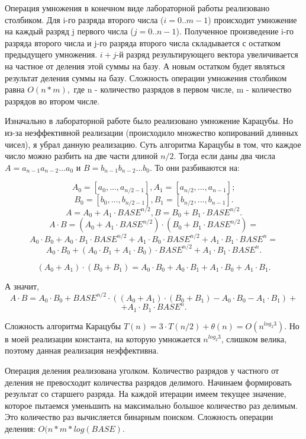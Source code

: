\documentclass[12pt]{article}
\begin{document}
Операция умножения в конечном виде лабораторной работы реализовано столбиком. Для i-го разряда второго числа ($i = 0..m-1$) происходит умножение на каждый разряд j первого числа ($j = 0..n-1$). Полученное произведение i-го разряда второго числа и j-го разряда второго числа складывается с остатком предыдущего умножения. $i+j$-й разряд результирующего вектора увеличивается на частное от деления этой суммы на базу. А новым остатком будет являться результат деления суммы на базу. Сложность операции умножения столбиком равна $O(n * m), $ где n - количество разрядов в первом числе, m - количество разрядов во втором числе.

Изначально в лабораторной работе было реализовано умножение Карацубы. Но из-за неэффективной реализации (происходило множество копирований длинных чисел), я убрал данную реализацию. Суть алгоритма Карацубы в том, что каждое число можно разбить на две части длиной $n / 2$. Тогда если даны два числа $A = a_{n-1}a_{n-2}...a_0$ и $B = b_{n-1}b_{n-2}...b_0$. То они разбиваются на:

$$
    A_0 = [a_0, ..., a_{n / 2 - 1}], A_1 = [a_{n / 2}, ..., a_{n - 1}];
$$
$$
    B_0 = [b_0, ..., b_{n / 2 - 1}], B_1 = [b_{n / 2}, ..., b_{n - 1}].
$$
$$
    A = A_0 + A_1 \cdot BASE^{n / 2}, B = B_0 + B_1 \cdot BASE^{n / 2}.
$$
$$A \cdot B = (A_0 + A_1 \cdot BASE^{n / 2}) \cdot (B_0 + B_1 \cdot BASE^{n / 2}) =$$ 
$$A_0 \cdot B_0 + A_0 \cdot B_1 \cdot BASE^{n / 2} + A_1 \cdot B_0 \cdot BASE^{n / 2} + A_1 \cdot B_1 \cdot BASE^{n} =$$
$$A_0 \cdot B_0 + (A_0 \cdot B_1 + A_1 \cdot B_0) \cdot BASE^{n / 2} + A_1 \cdot B_1 \cdot BASE^{n}.$$

$$(A_0 + A_1) \cdot (B_0 + B_1) = A_0 \cdot B_0 + A_0 \cdot B_1 + A_1 \cdot B_0 + A_1 \cdot B_1.$$

А значит, 
$$A \cdot B = A_0 \cdot B_0 + BASE^{n / 2} \cdot ((A_0 + A_1) \cdot (B_0 + B_1) - A_0 \cdot B_0 - A_1 \cdot B_1) + $$
$$+ A_1 \cdot B_1 \cdot BASE^{n}.$$

Сложность алгоритма Карацубы $T(n) = 3 \cdot T(n / 2) + \theta(n) = O(n^{log_2{3}})$. Но в моей реализации константа, на которую умножается $n^{log_2{3}}$, слишком велика, поэтому данная реализация неэффективна. 

Операция деления реализована уголком. Количество разрядов у частного от деления не превосходит количества разрядов делимого. Начинаем формировать результат со старшего разряда. На каждой итерации имеем текущее значение, которое пытаемся уменьшить на максимально большое количество раз делимым. Это количество раз вычисляется бинарным поиском. Сложность операции деления: $O(n * m * log(BASE)$.
\end{document}
